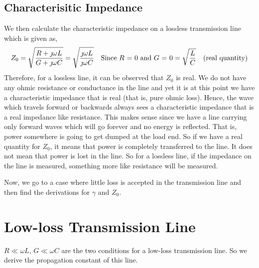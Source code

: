 \subsection{Characterisitic Impedance}
We then calculate the characteristic impedance on a lossless transmission line which is given as,
\begin{dmath*}
Z_0 = \sqrt{\frac{R + \jmath\omega L}{G + \jmath\omega C}}
= \sqrt{\frac{\jmath\omega L}{\jmath\omega C}}\quad\text{Since }R\text{ = }0\text{ and }G\text{ = }0
= \sqrt{\frac{L}{C}} \quad\textnormal{(real quantity)}
\end{dmath*}
Therefore, for a lossless line, it can be observed that $Z_0$ is real. We do not have any ohmic resistance or conductance in the line and yet it is at this point we have a characteristic impedance that is real (that is, pure ohmic loss). Hence, the wave which travels forward or backwards always sees a characteristic impedance that is a real impedance like resistance. This makes sense since we have a line carrying only forward waves which will go forever and no energy is reflected. That is, power somewhere is going to get dumped at the load end. So if we have a real quantity for $Z_0$, it means that power is completely transferred to the line. It does not mean that power is lost in the line. So for a lossless line, if the impedance on the line is measured, something more like resistance will be measured.

Now, we go to a case where little loss is accepted in the transmission line and then find the derivations for $\gamma$ and $Z_0$.

\section{Low-loss Transmission Line}
$R\ll\omega L$, $G\ll\omega C$ are the two conditions for a low-loss transmission line. So we derive the propagation constant of this line.

